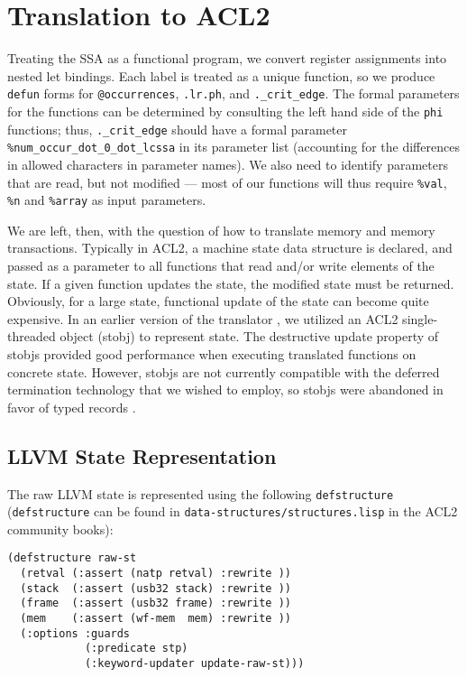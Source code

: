 \documentclass{eptcs}
\begin{document}
\section{Translation to ACL2}\label{translation}

Treating the SSA as a functional program, we convert register assignments
into nested let bindings.  Each label is treated as a unique function, so we
produce \texttt{defun} forms for \texttt{@occurrences},
\texttt{.lr.ph}, and \texttt{.\_crit\_edge}.  The formal parameters
for the functions can be determined by consulting the left hand side
of the \texttt{phi} functions; thus, \texttt{.\_crit\_edge} should
have a formal parameter \texttt{\%num\_occur\_dot\_0\_dot\_lcssa} in
its parameter list (accounting for the differences in allowed
characters in parameter names).  We also need to identify parameters
that are read, but not modified --- most of our functions will thus
require \texttt{\%val}, \texttt{\%n} and \texttt{\%array} as input
parameters.

We are left, then, with the question of how to translate memory and
memory transactions.  Typically in ACL2, a machine state data
structure is declared, and passed as a parameter to all functions that
read and/or write elements of the state.  If a given function updates
the state, the modified state must be returned.  Obviously, for a large
state, functional update of the state can become quite expensive.  
In an earlier version of the translator \cite{LLVMtoACL2}, we utilized an ACL2
single-threaded object (stobj) \cite{STOBJ} to represent state.  The 
destructive update property of stobjs provided good performance 
when executing translated functions on concrete state.  
However, stobjs are not currently compatible with the deferred 
termination technology that we wished to employ, so stobjs were 
abandoned in favor of typed records \cite{defrecord03}.

\subsection{LLVM State Representation}\label{state}

The raw LLVM state is represented using the following
\texttt{defstructure} (\texttt{defstructure} can be found in
\texttt{data-structures/structures.lisp} in the ACL2 community books):

\begin{verbatim}
(defstructure raw-st
  (retval (:assert (natp retval) :rewrite ))
  (stack  (:assert (usb32 stack) :rewrite ))
  (frame  (:assert (usb32 frame) :rewrite ))
  (mem    (:assert (wf-mem  mem) :rewrite ))
  (:options :guards
            (:predicate stp)
            (:keyword-updater update-raw-st)))
\end{verbatim}
\end{document}
